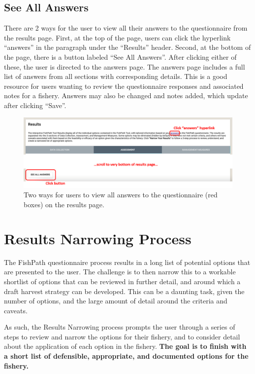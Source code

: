\documentclass[
  11pt,
]{book}
\begin{document}
\hypertarget{see-all-answers}{%
\subsection{See All Answers}\label{see-all-answers}}

There are 2 ways for the user to view all their answers to the questionnaire from the results page. First, at the top of the page, users can click the hyperlink ``answers'' in the paragraph under the ``Results'' header. Second, at the bottom of the page, there is a button labeled ``See All Answers''. After clicking either of these, the user is directed to the answers page. The answers page includes a full list of answers from all sections with corresponding details. This is a good resource for users wanting to review the questionnaire responses and associated notes for a fishery. Answers may also be changed and notes added, which update after clicking ``Save''.

\begin{figure}

{\centering \includegraphics[width=0.75\linewidth]{images/see-all-answers-buttons} 

}

\caption{Two ways for users to view all answers to the questionnaire (red boxes) on the results page.}\label{fig:answers-buttons}
\end{figure}

\hypertarget{Results-Narrowing}{%
\section{Results Narrowing Process}\label{Results-Narrowing}}

The FishPath questionnaire process results in a long list of potential options that are presented to the user. The challenge is to then narrow this to a workable shortlist of options that can be reviewed in further detail, and around which a draft harvest strategy can be developed. This can be a daunting task, given the number of options, and the large amount of detail around the criteria and caveats.

As such, the Results Narrowing process prompts the user through a series of steps to review and narrow the options for their fishery, and to consider detail about the application of each option in the fishery. \textbf{The goal is to finish with a short list of defensible, appropriate, and documented options for the fishery.}
\end{document}
